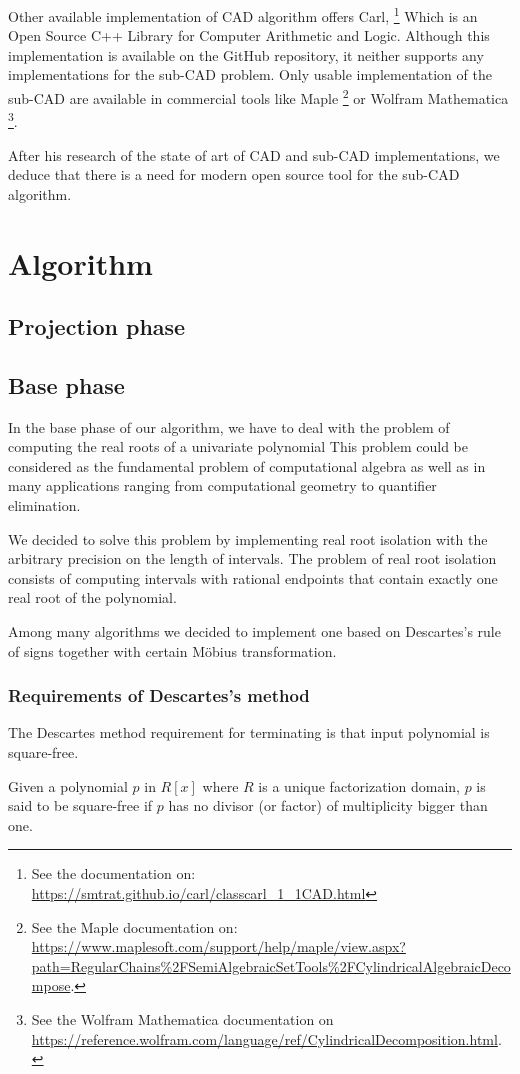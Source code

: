 \documentclass[
  digital, %
  twoside, %
  table,   %
  nolof,     %
  nolot,     %
]{fithesis3}
\begin{document}
Other available implementation of CAD algorithm offers Carl,
\footnote{
  See the documentation on: \url{https://smtrat.github.io/carl/classcarl_1_1CAD.html}
}
Which is an Open Source C++ Library for Computer Arithmetic and Logic. Although this implementation is available on the GitHub repository, it neither supports any implementations for the sub-CAD problem.
Only usable implementation of the sub-CAD are available in commercial tools like Maple 
\footnote{
See the Maple documentation on: \url{https://www.maplesoft.com/support/help/maple/view.aspx?path=RegularChains\%2FSemiAlgebraicSetTools\%2FCylindricalAlgebraicDecompose}.
}
or Wolfram Mathematica 
\footnote{
  See the Wolfram Mathematica documentation on \url{https://reference.wolfram.com/language/ref/CylindricalDecomposition.html}.
}.

After his research of the state of art of CAD and sub-CAD implementations, we deduce that there is a need for modern open source tool for the sub-CAD algorithm.

\chapter{Algorithm}
\section{Projection phase}
\section{Base phase}
In the base phase of our algorithm, we have to deal with the problem of computing the real roots of a univariate polynomial This problem  could be considered as the fundamental problem of computational algebra\parencite{yap2000fundamental} as well as in many applications ranging from computational geometry to quantifier elimination. 

We decided to solve this problem by implementing real root isolation with the arbitrary precision on the length of intervals. The problem of real root isolation consists of computing intervals with rational endpoints that contain exactly one real root of the polynomial.\parencite{10.1007/11841036_72}

Among many algorithms we decided to implement one based on Descartes's rule of signs together with certain Möbius transformation.

 \subsection{Requirements of Descartes's method}
 The Descartes method requirement for terminating is that input polynomial is square-free.\parencite{ganzha2005computer}
  \begin{definition}
 Given a polynomial $p$ in $R[x]$ where $R$ is a unique factorization domain, $p$ is said to be square-free if $p$ has no divisor (or factor) of multiplicity bigger than one.\parencite{Yun:1976:SDA:800205.806320}
\end{definition}
\end{document}
